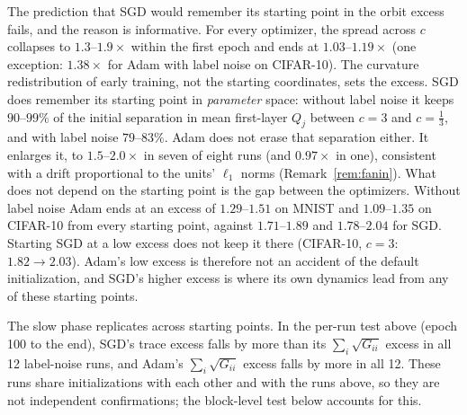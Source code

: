 \documentclass[10pt]{article}
\theoremstyle{remark}
\begin{document}
The prediction that SGD would remember its starting point in the orbit excess fails, and the reason is informative. For every optimizer, the spread across $c$ collapses to $1.3$--$1.9\times$ within the first epoch and ends at $1.03$--$1.19\times$ (one exception: $1.38\times$ for Adam with label noise on CIFAR-10). The curvature redistribution of early training, not the starting coordinates, sets the excess. SGD does remember its starting point in \emph{parameter} space: without label noise it keeps $90$--$99\%$ of the initial separation in mean first-layer $Q_j$ between $c=3$ and $c=\tfrac13$, and with label noise $79$--$83\%$. Adam does not erase that separation either. It enlarges it, to $1.5$--$2.0\times$ in seven of eight runs (and $0.97\times$ in one), consistent with a drift proportional to the units' $\ell_1$ norms (Remark~\ref{rem:fanin}). What does not depend on the starting point is the gap between the optimizers. Without label noise Adam ends at an excess of $1.29$--$1.51$ on MNIST and $1.09$--$1.35$ on CIFAR-10 from every starting point, against $1.71$--$1.89$ and $1.78$--$2.04$ for SGD. Starting SGD at a low excess does not keep it there (CIFAR-10, $c=3$: $1.82\to2.03$). Adam's low excess is therefore not an accident of the default initialization, and SGD's higher excess is where its own dynamics lead from any of these starting points.

The slow phase replicates across starting points. In the per-run test above (epoch 100 to the end), SGD's trace excess falls by more than its $\sum_i\sqrt{G_{ii}}$ excess in all 12 label-noise runs, and Adam's $\sum_i\sqrt{G_{ii}}$ excess falls by more in all 12. These runs share initializations with each other and with the runs above, so they are not independent confirmations; the block-level test below accounts for this.
\end{document}
